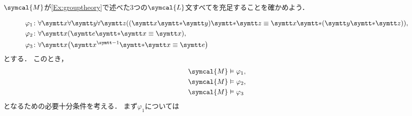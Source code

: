 \(\symcal{M}\)が\cref{Ex:grouptheory}で述べた3つの\(\symcal{L}\)文すべてを充足することを確かめよう．

\begin{align*}
	\varphi_1 \colon & \forall \obj{x} \forall \obj{y} \forall \obj{z}
	\paren{\paren{\obj{x} \obj{\ast} \obj{y}} \obj{\ast} \obj{z} \objeq \obj{x} \obj{\ast} \paren{\obj{y} \obj{\ast} \obj{z}}}, \\
	\varphi_2 \colon & \forall \obj{x} \paren{\obj{e} \obj{\ast} \obj{x} \objeq \obj{x}},                                       \\
	\varphi_3 \colon & \forall \obj{x} \paren{\obj{x}^{\obj{-1}} \obj{\ast} \obj{x} \objeq \obj{e}}
\end{align*}
とする．
このとき，
\begin{align*}
	\symcal{M} & \satisfy \varphi_1, \\
	\symcal{M} & \satisfy \varphi_2, \\
	\symcal{M} & \satisfy \varphi_3  \\
\end{align*}
となるための必要十分条件を考える．
まず\(\varphi_1\)については
